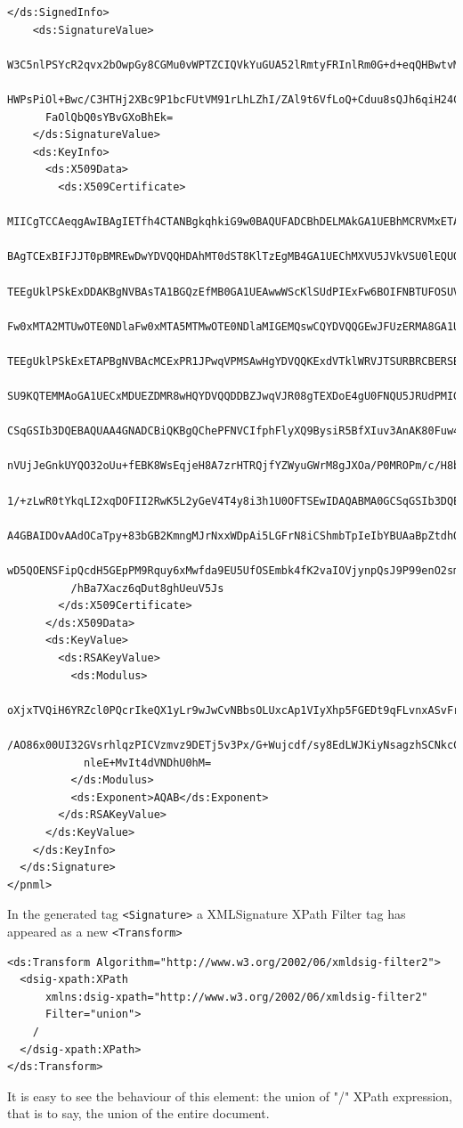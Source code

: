 \begin{lstlisting}[basicstyle=\ttfamily\tiny]
    </ds:SignedInfo>
    <ds:SignatureValue>
      W3C5nlPSYcR2qvx2bOwpGy8CGMu0vWPTZCIQVkYuGUA52lRmtyFRInlRm0G+d+eqQHBwtvMophte
      HWPsPiOl+Bwc/C3HTHj2XBc9P1bcFUtVM91rLhLZhI/ZAl9t6VfLoQ+Cduu8sQJh6qiH24CiYGjc
      FaOlQbQ0sYBvGXoBhEk=
    </ds:SignatureValue>
    <ds:KeyInfo>
      <ds:X509Data>
        <ds:X509Certificate>
          MIICgTCCAeqgAwIBAgIETfh4CTANBgkqhkiG9w0BAQUFADCBhDELMAkGA1UEBhMCRVMxETAPBgNV
          BAgTCExBIFJJT0pBMREwDwYDVQQHDAhMT0dST8KlTzEgMB4GA1UEChMXVU5JVkVSU0lEQUQgREUg
          TEEgUklPSkExDDAKBgNVBAsTA1BGQzEfMB0GA1UEAwwWScKlSUdPIExFw6BOIFNBTUFOSUVHTzAe
          Fw0xMTA2MTUwOTE0NDlaFw0xMTA5MTMwOTE0NDlaMIGEMQswCQYDVQQGEwJFUzERMA8GA1UECBMI
          TEEgUklPSkExETAPBgNVBAcMCExPR1JPwqVPMSAwHgYDVQQKExdVTklWRVJTSURBRCBERSBMQSBS
          SU9KQTEMMAoGA1UECxMDUEZDMR8wHQYDVQQDDBZJwqVJR08gTEXDoE4gU0FNQU5JRUdPMIGfMA0G
          CSqGSIb3DQEBAQUAA4GNADCBiQKBgQChePFNVCIfphFlyXQ9BysiR5BfXIuv3AnAK80Fuw4tTFwC
          nVUjJeGnkUYQO32oUu+fEBK8WsEqjeH8A7zrHTRQjfYZWyuGWrM8gJXOa/P0MROPm/c/H8b5a6Nx
          1/+zLwR0tYkqLI2xqDOFII2RwK5L2yGeV4T4y8i3h1U0OFTSEwIDAQABMA0GCSqGSIb3DQEBBQUA
          A4GBAIDOvAAdOCaTpy+83bGB2KmngMJrNxxWDpAi5LGFrN8iCShmbTpIeIbYBUAaBpZtdhOnhq4n
          wD5QOENSFipQcdH5GEpPM9Rquy6xMwfda9EU5UfOSEmbk4fK2vaIOVjynpQsJ9P99enO2smQlyvw
          /hBa7Xacz6qDut8ghUeuV5Js
        </ds:X509Certificate>
      </ds:X509Data>
      <ds:KeyValue>
        <ds:RSAKeyValue>
          <ds:Modulus>
            oXjxTVQiH6YRZcl0PQcrIkeQX1yLr9wJwCvNBbsOLUxcAp1VIyXhp5FGEDt9qFLvnxASvFrBKo3h
            /AO86x00UI32GVsrhlqzPICVzmvz9DETj5v3Px/G+Wujcdf/sy8EdLWJKiyNsagzhSCNkcCuS9sh
            nleE+MvIt4dVNDhU0hM=
          </ds:Modulus>
          <ds:Exponent>AQAB</ds:Exponent>
        </ds:RSAKeyValue>
      </ds:KeyValue>
    </ds:KeyInfo>
  </ds:Signature>
</pnml>
\end{lstlisting}

In the generated tag \texttt{<Signature>} a XMLSignature XPath Filter tag has
appeared as a new \texttt{<Transform>}

\begin{lstlisting} 
<ds:Transform Algorithm="http://www.w3.org/2002/06/xmldsig-filter2">
  <dsig-xpath:XPath
      xmlns:dsig-xpath="http://www.w3.org/2002/06/xmldsig-filter2"
      Filter="union">
    /
  </dsig-xpath:XPath>
</ds:Transform>
\end{lstlisting}

It is easy to see the behaviour of this element: the union of "/" XPath expression,
that is to say, the union of the entire document.


